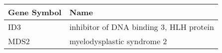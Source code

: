 \begin{tabular}{ll}
\toprule
Gene Symbol &                                    Name \\
\midrule
        ID3 & inhibitor of DNA binding 3, HLH protein \\
       MDS2 &              myelodysplastic syndrome 2 \\
\bottomrule
\end{tabular}
